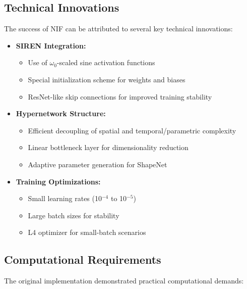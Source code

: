 \documentclass[10pt,journal,compsoc]{IEEEtran}
\begin{document}
\subsection{Technical Innovations}
The success of NIF can be attributed to several key technical innovations:

\begin{itemize}
    \item \textbf{SIREN Integration:}
    \begin{itemize}
        \item Use of $\omega_0$-scaled sine activation functions
        \item Special initialization scheme for weights and biases
        \item ResNet-like skip connections for improved training stability
    \end{itemize}
    
    \item \textbf{Hypernetwork Structure:}
    \begin{itemize}
        \item Efficient decoupling of spatial and temporal/parametric complexity
        \item Linear bottleneck layer for dimensionality reduction
        \item Adaptive parameter generation for ShapeNet
    \end{itemize}
    
    \item \textbf{Training Optimizations:}
    \begin{itemize}
        \item Small learning rates (10$^{-4}$ to 10$^{-5}$)
        \item Large batch sizes for stability
        \item L4 optimizer for small-batch scenarios
    \end{itemize}
\end{itemize}

\subsection{Computational Requirements}
The original implementation demonstrated practical computational demands:
\end{document}
